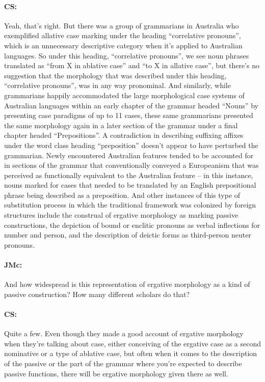 \documentclass[output=paper]{langscibook}
\begin{document}
\paragraph*{CS:} \begin{sloppypar}Yeah, that’s right. But there was a group of grammarians in Australia who exemplified allative case marking under the heading “correlative pronouns”, which is an unnecessary descriptive category when it’s applied to Australian languages. So under this heading, “correlative pronouns”, we see noun phrases translated as “from X in ablative case” and “to X in allative case”, but there’s no suggestion that the morphology that was described under this heading, “correlative pronouns”, was in any way pronominal. And similarly, while grammarians happily accommodated the large morphological case systems of Australian languages within an early chapter of the grammar headed “Nouns” by presenting case paradigms of up to 11 cases, these same grammarians presented the same morphology again in a later section of the grammar under a final chapter headed “Prepositions”. A contradiction in describing suffixing affixes under the word class heading “preposition” doesn’t appear to have perturbed the grammarian. Newly encountered Australian features tended to be accounted for in sections of the grammar that conventionally conveyed a Europeanism that was perceived as functionally equivalent to the Australian feature – in this instance, nouns marked for cases that needed to be translated by an English prepositional phrase being described as a preposition. And other instances of this type of substitution process in which the traditional framework was colonized by foreign structures include the construal of ergative morphology as marking passive constructions, the depiction of bound or enclitic pronouns as verbal inflections for number and person, and the description of deictic forms as third-person neuter pronouns.\end{sloppypar}


\paragraph*{JMc:}  And how widespread is this representation of ergative morphology as a kind of passive construction? How many different scholars do that?


\paragraph*{CS:}  Quite a few. Even though they made a good account of ergative morphology when they’re talking about case, either conceiving of the ergative case as a second nominative or a type of ablative case, but often when it comes to the description of the passive or the part of the grammar where you’re expected to describe passive functions, there will be ergative morphology given there as well.
\end{document}

